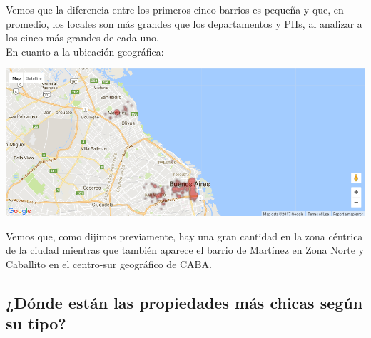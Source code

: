 \documentclass[a4paper, 10pt]{article}
\newcommand\tab[1][0.5cm]{\hspace*{#1}}
\begin{document}
				  	\tab Vemos que la diferencia entre los primeros cinco barrios es pequeña y que, en promedio, los locales son
				  	más grandes que los departamentos y PHs, al analizar a los cinco más grandes de cada uno. \\
				  	\tab En cuanto a la ubicación geográfica:
				  	\begin{center}
   		    				\includegraphics[width=\textwidth]{images/storeSurfaceTopMap}
				  	\end{center}
				  	\tab Vemos que, como dijimos previamente, hay una gran cantidad en la zona céntrica de la ciudad mientras que
				  	también aparece el barrio de Martínez en Zona Norte y Caballito en el centro-sur geográfico de CABA.
			\subsection{¿Dónde están las propiedades más chicas según su tipo?}	
\end{document}
